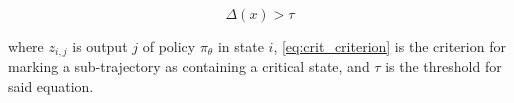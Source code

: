 \documentclass[UKenglish]{uiomasterthesis}
\begin{document}
\begin{equation}
\label{eq:crit_criterion}
\Delta(x) > \tau
\end{equation}

where $z_{i,j}$ is output $j$ of policy $\pi_\theta$ in state $i$, \cref{eq:crit_criterion} is the criterion for marking a sub-trajectory as containing a critical state, and $\tau$ is the threshold for said equation.

%
%
\end{document}
